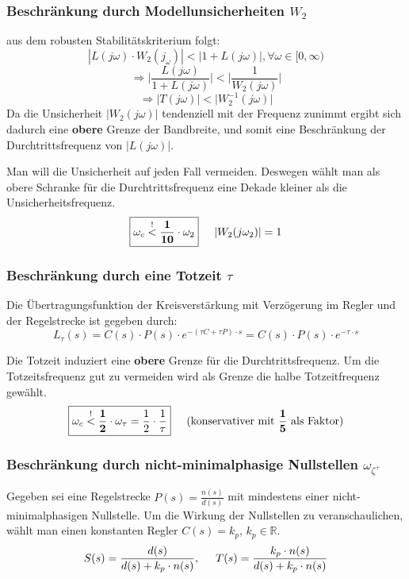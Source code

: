         \subsubsection{Beschränkung durch Modellunsicherheiten $W_2$}
            aus dem robusten Stabilitätskriterium folgt: 
            \[|L(j\omega)\cdot W_2(j_\omega)| < |1+L(j\omega)|, \forall \omega\in[0,\infty)\]
            \[\Rightarrow \bigg|\frac{L(j\omega)}{1+L(j\omega)}\bigg|<\bigg|\frac{1}{W_2(j\omega)}\bigg|\]
            \[\Rightarrow |T(j\omega)|<\big|W_2^{-1}(j\omega)\big|\]
            Da die Unsicherheit $|W_2(j\omega)|$  tendenziell mit der Frequenz zunimmt
            ergibt sich dadurch eine \textbf{obere} Grenze der Bandbreite, und somit eine Beschränkung der Durchtrittsfrequenz von $|L(j\omega)|$.
            
            Man will die Unsicherheit auf jeden Fall vermeiden. Deswegen wählt man als obere Schranke für die Durchtrittsfrequenz eine Dekade kleiner als die Unsicherheitsfrequenz.
            \[\boxed{\omega_c\overset{!}{<}\mathbf{\frac{1}{10}}\cdot\omega_2} \hspace{5mm}|W_2(j\omega_2)|=1\]
        \subsubsection{Beschränkung durch eine Totzeit $\tau$}
            Die Übertragungsfunktion der Kreisverstärkung mit Verzögerung im Regler und der Regelstrecke ist gegeben durch: 
            \[L_\tau(s) = C(s)\cdot P(s)\cdot e^{-(\tau C + \tau P)\cdot s} = C(s) \cdot P(s) \cdot e^{-\tau\cdot s}\]
                
            Die Totzeit induziert eine \textbf{obere} Grenze für die Durchtrittsfrequenz. Um die Totzeitsfrequenz gut zu vermeiden wird als Grenze die halbe Totzeitfrequenz gewählt.
            \[\boxed{\omega_c \overset{!}{<}\mathbf{\frac{1}{2}} \cdot \omega_\tau = \frac{1}{2}\cdot\frac{1}{\tau}}\hspace{5mm} (\textrm{konservativer mit } \mathbf{\frac{1}{5}} \textrm{ als Faktor)}\]
        \subsubsection{ Beschränkung durch nicht-minimalphasige Nullstellen $\omega_{\zeta^+}$}
        Gegeben sei eine Regelstrecke $P(s) = \frac{n(s)}{d(s)}$ mit mindestens einer nicht-minimalphasigen Nullstelle. Um die Wirkung der Nullstellen zu veranschaulichen, wählt man einen konstanten Regler $C(s) = k_p$, $k_p \in \mathbb{R}$.
        \[S(s) = \frac{d(s)}{d(s)+k_p\cdot n(s)}, \hspace{5mm} T(s) = \frac{k_p\cdot n(s)}{d(s)+k_p\cdot n(s)}\] 
        
